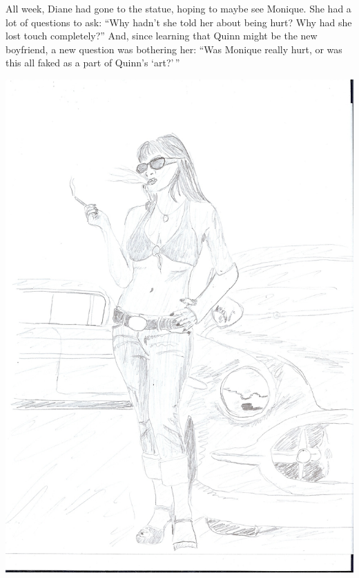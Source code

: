 All week, Diane had gone to the statue, hoping to maybe see Monique. She had a lot of
questions to ask: ``Why hadn't she told her about being hurt?  Why had she lost touch
completely?'' And, since learning that Quinn might be the new boyfriend, a new question was
bothering her: ``Was Monique really hurt, or was this all faked as a part of Quinn's `art?'\,''
\newpage
\begin{center}
\includegraphics[height=0.8\textheight]{images/kicks50.jpg}
\end{center}
